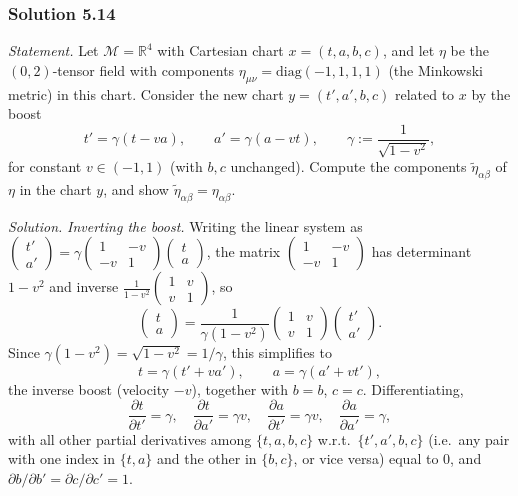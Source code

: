 \documentclass[11pt]{article}
\begin{document}
\subsubsection*{Solution 5.14}

\noindent\textit{Statement.} Let $\mathcal M=\mathbb R^4$ with Cartesian
chart $x=(t,a,b,c)$, and let $\eta$ be the $(0,2)$-tensor field with
components $\eta_{\mu\nu}=\mathrm{diag}(-1,1,1,1)$ (the Minkowski metric)
in this chart. Consider the new chart $y=(t',a',b,c)$ related to $x$ by
the boost
\[
t'=\gamma(t-va),\qquad a'=\gamma(a-vt),\qquad \gamma:=\frac{1}{\sqrt{1-v^2}},
\]
for constant $v\in(-1,1)$ (with $b,c$ unchanged). Compute the components
$\widetilde\eta_{\alpha\beta}$ of $\eta$ in the chart $y$, and show
$\widetilde\eta_{\alpha\beta}=\eta_{\alpha\beta}$.

\medskip
\noindent\textit{Solution.} \emph{Inverting the boost.} Writing the linear
system as $\begin{pmatrix}t'\\a'\end{pmatrix}=\gamma\begin{pmatrix}1&-v\\
-v&1\end{pmatrix}\begin{pmatrix}t\\a\end{pmatrix}$, the matrix
$\begin{pmatrix}1&-v\\-v&1\end{pmatrix}$ has determinant $1-v^2$ and
inverse $\frac{1}{1-v^2}\begin{pmatrix}1&v\\v&1\end{pmatrix}$, so
\[
\begin{pmatrix}t\\a\end{pmatrix} = \frac{1}{\gamma(1-v^2)}\begin{pmatrix}1&v\\v&1\end{pmatrix}\begin{pmatrix}t'\\a'\end{pmatrix}.
\]
Since $\gamma(1-v^2)=\sqrt{1-v^2}=1/\gamma$, this simplifies to
\[
t=\gamma(t'+va'),\qquad a=\gamma(a'+vt'),
\]
the inverse boost (velocity $-v$), together with $b=b$, $c=c$.
Differentiating,
\[
\frac{\partial t}{\partial t'}=\gamma,\quad \frac{\partial t}{\partial a'}=\gamma v,\quad \frac{\partial a}{\partial t'}=\gamma v,\quad \frac{\partial a}{\partial a'}=\gamma,
\]
with all other partial derivatives among $\{t,a,b,c\}$ w.r.t.\
$\{t',a',b,c\}$ (i.e.\ any pair with one index in $\{t,a\}$ and the other
in $\{b,c\}$, or vice versa) equal to $0$, and $\partial b/\partial b'=
\partial c/\partial c'=1$.
\end{document}
